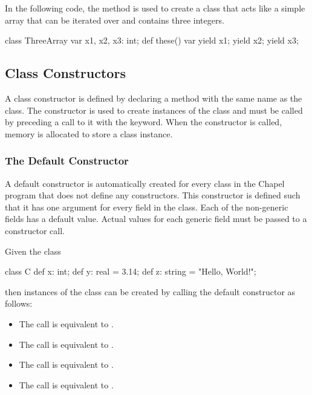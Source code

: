 \begin{example}
In the following code, the  method is used to create a
class that acts like a simple array that can be iterated over and
contains three integers.
\begin{chapel}
class ThreeArray {
  var x1, x2, x3: int;
  def these() var {
    yield x1;
    yield x2;
    yield x3;
  }
}
\end{chapel}
\end{example}

\subsection{Class Constructors}
\label{Class_Constructors}

A class constructor is defined by declaring a method with the same
name as the class.  The constructor is used to create instances of the
class and must be called by preceding a call to it with the 
keyword.  When the constructor is called, memory is allocated to store
a class instance.

\subsubsection{The Default Constructor}
\label{The_Default_Constructor}

A default constructor is automatically created for every class in the
Chapel program that does not define any constructors.  This
constructor is defined such that it has one argument for every field
in the class.  Each of the non-generic fields has a default value.
Actual values for each generic field must be passed to a constructor
call.

\begin{example}
Given the class
\begin{chapel}
class C {
  def x: int;
  def y: real = 3.14;
  def z: string = "Hello, World!";
}
\end{chapel}
then instances of the class can be created by calling the default
constructor as follows:
\begin{itemize}
\item The call  is equivalent to .
\item The call  is equivalent to .
\item The call  is equivalent to .
\item The call  is equivalent to .
\end{itemize}
\end{example}


